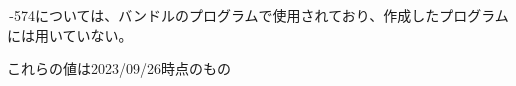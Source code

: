 \clearpage
\,-\ttNum574については、バンドルのプログラムで使用されており、作成したプログラムには用いていない。
\begin{marker}
これらの値は2023/09/26時点のもの
\end{marker}

